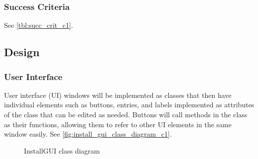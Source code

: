 \documentclass[11pt]{article}
\begin{document}
            \subsubsection{Success Criteria}
                See \autoref{tbl:succ_crit_c1}.
                
        \subsection{Design}

            \subsubsection{User Interface}
                User interface (UI) windows will be implemented as classes that then have individual elements such as buttons, entries, and labels implemented as attributes of the class that can be edited as needed. Buttons will call methods in the class as their functions, allowing them to refer to other UI elements in the same window easily. See \autoref{fig:install_gui_class_diagram_c1}.

                \begin{figure}[!ht]
                    \centering
                    \caption{InstallGUI class diagram}
                    \label{fig:install_gui_class_diagram_c1}
                \end{figure}
\end{document}
